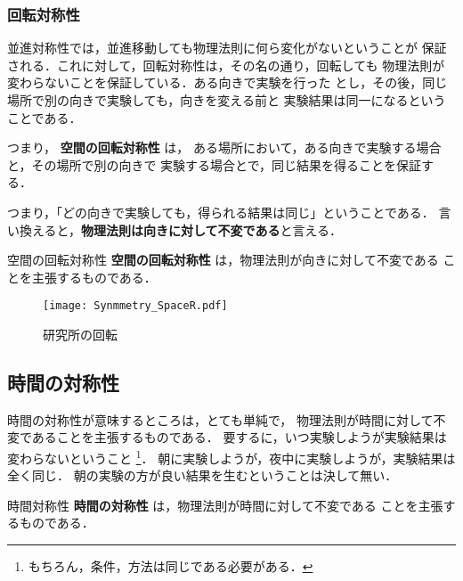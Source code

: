             \subsubsection{回転対称性}
                並進対称性では，並進移動しても物理法則に何ら変化がないということが
                保証される．これに対して，回転対称性は，その名の通り，回転しても
                物理法則が変わらないことを保証している．ある向きで実験を行った
                とし，その後，同じ場所で別の向きで実験しても，向きを変える前と
                実験結果は同一になるということである．

                つまり，
                \textbf{空間の回転対称性} は，
                ある場所において，ある向きで実験する場合と，その場所で別の向きで
                実験する場合とで，同じ結果を得ることを保証する．

                つまり，「どの向きで実験しても，得られる結果は同じ」ということである．
                言い換えると，\textbf{物理法則は向きに対して不変である}と言える．
                    \begin{myshadebox}{空間の回転対称性}
                        \textbf{空間の回転対称性} は，物理法則が向きに対して不変である
                        ことを主張するものである．
                    \end{myshadebox}

                    \begin{figure}[hbt]
                        \begin{center}
                            \texttt{[image: Synmmetry\_SpaceR.pdf]}
                            \caption{研究所の回転}
                            \label{fig:Synmmetry_SpaceR}
                        \end{center}
                    \end{figure}


        \subsection{時間の対称性}
            時間の対称性が意味するところは，とても単純で，
            物理法則が時間に対して不変であることを主張するものである．
            要するに，いつ実験しようが実験結果は変わらないということ
                \footnote{
                    もちろん，条件，方法は同じである必要がある．
                }．
            朝に実験しようが，夜中に実験しようが，実験結果は全く同じ．
            朝の実験の方が良い結果を生むということは決して無い．
                    \begin{myshadebox}{時間対称性}
                        \textbf{時間の対称性} は，物理法則が時間に対して不変である
                        ことを主張するものである．
                    \end{myshadebox}


